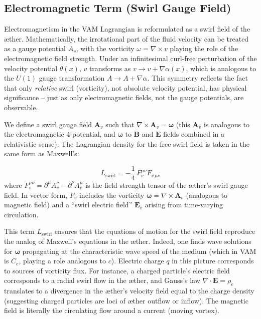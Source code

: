 \documentclass[a4paper,12pt]{article}
\begin{document}
        
        \subsection{Electromagnetic Term (Swirl Gauge Field)}
        
        Electromagnetism in the VAM Lagrangian is reformulated as a swirl field of the æther. Mathematically, the irrotational part of the fluid velocity can be treated as a gauge potential $A_v$, with the vorticity $\omega = \nabla \times v$ playing the role of the electromagnetic field strength. Under an infinitesimal curl-free perturbation of the velocity potential $\theta(x)$, $v$ transforms as $v \to v + \nabla \alpha(x)$, which is analogous to the $U(1)$ gauge transformation $A \to A + \nabla \alpha$. This symmetry reflects the fact that only \textit{relative} swirl (vorticity), not absolute velocity potential, has physical significance – just as only electromagnetic fields, not the gauge potentials, are observable.
        
        
        We define a swirl gauge field $\mathbf{A}_v$ such that $\nabla \times \mathbf{A}_v = \mathbf{\omega}$ (this $\mathbf{A}_v$ is analogous to the electromagnetic 4-potential, and $\mathbf{\omega}$ to $\mathbf{B}$ and $\mathbf{E}$ fields combined in a relativistic sense). The Lagrangian density for the free swirl field is taken in the same form as Maxwell’s:
        
        \begin{equation}
            L_{\text{swirl}} = -\frac{1}{4}\, F_{v}^{\mu\nu} F_{v\,\mu\nu}
            \label{eq:swirl-lagrangian}
        \end{equation}
        where $F_v^{\mu\nu} = \partial^\mu A_v^{\nu} - \partial^\nu A_v^{\mu}$ is the field strength tensor of the æther’s swirl gauge field. In vector form, $F_v$ includes the vorticity $\mathbf{\omega} = \nabla \times \mathbf{A}_v$ (analogous to magnetic field) and a “swirl electric field” $\mathbf{E}_v$ arising from time-varying circulation.
        
        
        This term $L_{\text{swirl}}$ ensures that the equations of motion for the swirl field reproduce the analog of Maxwell’s equations in the æther. Indeed, one finds wave solutions for $\mathbf{\omega}$ propagating at the characteristic wave speed of the medium (which in VAM is $C_e$, playing a role analogous to $c$). Electric charge $q$ in this picture corresponds to sources of vorticity flux. For instance, a charged particle’s electric field corresponds to a radial swirl flow in the æther, and Gauss’s law $\nabla\cdot \mathbf{E} = \rho_e$ translates to a divergence in the æther’s velocity field equal to the charge density (suggesting charged particles are loci of æther outflow or inflow). The magnetic field is literally the circulating flow around a current (moving vortex).
        
\end{document}
